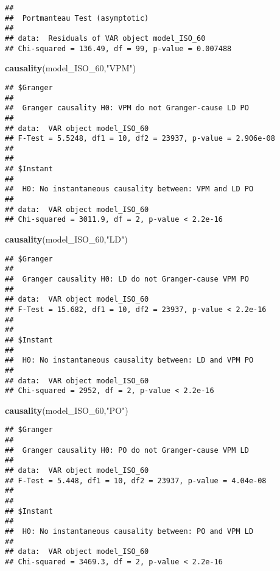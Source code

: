 \documentclass[
]{article}
\newenvironment{Shaded}{\begin{snugshade}}{\end{snugshade}}
\newcommand{\FunctionTok}[1]{\textcolor[rgb]{0.13,0.29,0.53}{\textbf{#1}}}
\newcommand{\NormalTok}[1]{#1}
\newcommand{\StringTok}[1]{\textcolor[rgb]{0.31,0.60,0.02}{#1}}
\begin{document}
\begin{verbatim}
## 
##  Portmanteau Test (asymptotic)
## 
## data:  Residuals of VAR object model_ISO_60
## Chi-squared = 136.49, df = 99, p-value = 0.007488
\end{verbatim}

\begin{Shaded}
\begin{Highlighting}[]
\FunctionTok{causality}\NormalTok{(model\_ISO\_60,}\StringTok{"VPM"}\NormalTok{)}
\end{Highlighting}
\end{Shaded}

\begin{verbatim}
## $Granger
## 
##  Granger causality H0: VPM do not Granger-cause LD PO
## 
## data:  VAR object model_ISO_60
## F-Test = 5.5248, df1 = 10, df2 = 23937, p-value = 2.906e-08
## 
## 
## $Instant
## 
##  H0: No instantaneous causality between: VPM and LD PO
## 
## data:  VAR object model_ISO_60
## Chi-squared = 3011.9, df = 2, p-value < 2.2e-16
\end{verbatim}

\begin{Shaded}
\begin{Highlighting}[]
\FunctionTok{causality}\NormalTok{(model\_ISO\_60,}\StringTok{"LD"}\NormalTok{)}
\end{Highlighting}
\end{Shaded}

\begin{verbatim}
## $Granger
## 
##  Granger causality H0: LD do not Granger-cause VPM PO
## 
## data:  VAR object model_ISO_60
## F-Test = 15.682, df1 = 10, df2 = 23937, p-value < 2.2e-16
## 
## 
## $Instant
## 
##  H0: No instantaneous causality between: LD and VPM PO
## 
## data:  VAR object model_ISO_60
## Chi-squared = 2952, df = 2, p-value < 2.2e-16
\end{verbatim}

\begin{Shaded}
\begin{Highlighting}[]
\FunctionTok{causality}\NormalTok{(model\_ISO\_60,}\StringTok{"PO"}\NormalTok{)}
\end{Highlighting}
\end{Shaded}

\begin{verbatim}
## $Granger
## 
##  Granger causality H0: PO do not Granger-cause VPM LD
## 
## data:  VAR object model_ISO_60
## F-Test = 5.448, df1 = 10, df2 = 23937, p-value = 4.04e-08
## 
## 
## $Instant
## 
##  H0: No instantaneous causality between: PO and VPM LD
## 
## data:  VAR object model_ISO_60
## Chi-squared = 3469.3, df = 2, p-value < 2.2e-16
\end{verbatim}
\end{document}
